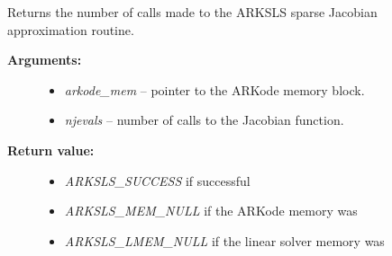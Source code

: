 \documentclass[letterpaper,10pt,english]{sphinxmanual}
\begin{document}

\begin{fulllineitems}
\label{c_interface/User_callable:c.ARKSlsGetNumJacEvals}
Returns the number of calls made to the ARKSLS
sparse Jacobian approximation routine.
\begin{description}
\item[{\textbf{Arguments:}}] \leavevmode\begin{itemize}
\item {} 
\emph{arkode\_mem} -- pointer to the ARKode memory block.

\item {} 
\emph{njevals} -- number of calls to the Jacobian function.

\end{itemize}

\item[{\textbf{Return value:}}] \leavevmode\begin{itemize}
\item {} 
\emph{ARKSLS\_SUCCESS} if successful

\item {} 
\emph{ARKSLS\_MEM\_NULL} if the ARKode memory was 

\item {} 
\emph{ARKSLS\_LMEM\_NULL} if the linear solver memory was 

\end{itemize}

\end{description}

\end{fulllineitems}

\end{document}
